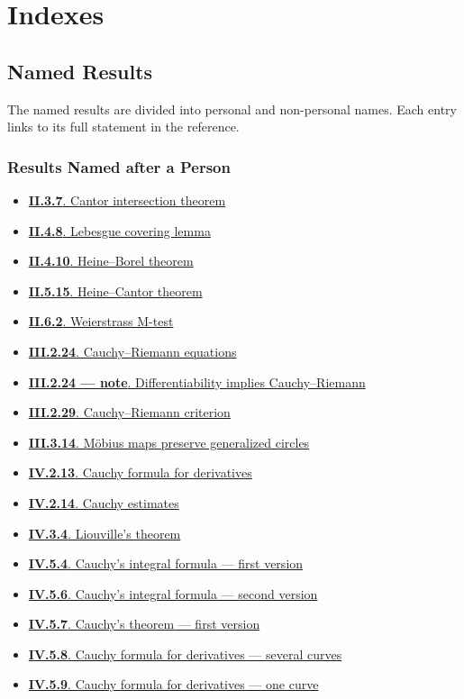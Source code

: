 \documentclass[11pt,a4paper,openany]{book}
\theoremstyle{studyplain}
\theoremstyle{studydefinition}
\theoremstyle{studyremark}
\newcommand{\NamedIndexItem}[3]{%
  \item \hyperref[#1]{\textbf{#2}. #3}%
}
\begin{document}
\part{Indexes}
\chapter{Named Results}
\label{named-result-index}
The named results are divided into personal and non-personal names. Each entry links to its full statement in the reference.

\section{Results Named after a Person}
\begin{multicols}{2}
\raggedcolumns
\raggedright
\begin{itemize}[leftmargin=*,itemsep=0.35em,topsep=0.2em]
\NamedIndexItem{result-ii-3-7-cantor-intersection-theorem}{II.3.7}{Cantor intersection theorem}
\NamedIndexItem{result-ii-4-8-lebesgue-covering-lemma}{II.4.8}{Lebesgue covering lemma}
\NamedIndexItem{result-ii-4-10-heine-borel-theorem}{II.4.10}{Heine–Borel theorem}
\NamedIndexItem{result-ii-5-15-heine-cantor-theorem}{II.5.15}{Heine–Cantor theorem}
\NamedIndexItem{result-ii-6-2-weierstrass-m-test}{II.6.2}{Weierstrass M-test}
\NamedIndexItem{result-iii-2-24-cauchy-riemann-equations}{III.2.24}{Cauchy–Riemann equations}
\NamedIndexItem{result-iii-2-24-note-differentiability-implies-cauchy-riemann}{III.2.24 — note}{Differentiability implies Cauchy–Riemann}
\NamedIndexItem{result-iii-2-29-cauchy-riemann-criterion}{III.2.29}{Cauchy–Riemann criterion}
\NamedIndexItem{result-iii-3-14-m-bius-maps-preserve-generalized-circles}{III.3.14}{Möbius maps preserve generalized circles}
\NamedIndexItem{result-iv-2-13-cauchy-formula-for-derivatives}{IV.2.13}{Cauchy formula for derivatives}
\NamedIndexItem{result-iv-2-14-cauchy-estimates}{IV.2.14}{Cauchy estimates}
\NamedIndexItem{result-iv-3-4-liouville-s-theorem}{IV.3.4}{Liouville’s theorem}
\NamedIndexItem{result-iv-5-4-cauchy-s-integral-formula-first-version}{IV.5.4}{Cauchy’s integral formula — first version}
\NamedIndexItem{result-iv-5-6-cauchy-s-integral-formula-second-version}{IV.5.6}{Cauchy’s integral formula — second version}
\NamedIndexItem{result-iv-5-7-cauchy-s-theorem-first-version}{IV.5.7}{Cauchy’s theorem — first version}
\NamedIndexItem{result-iv-5-8-cauchy-formula-for-derivatives-several-curves}{IV.5.8}{Cauchy formula for derivatives — several curves}
\NamedIndexItem{result-iv-5-9-cauchy-formula-for-derivatives-one-curve}{IV.5.9}{Cauchy formula for derivatives — one curve}

\end{itemize}
\end{multicols}
\end{document}
